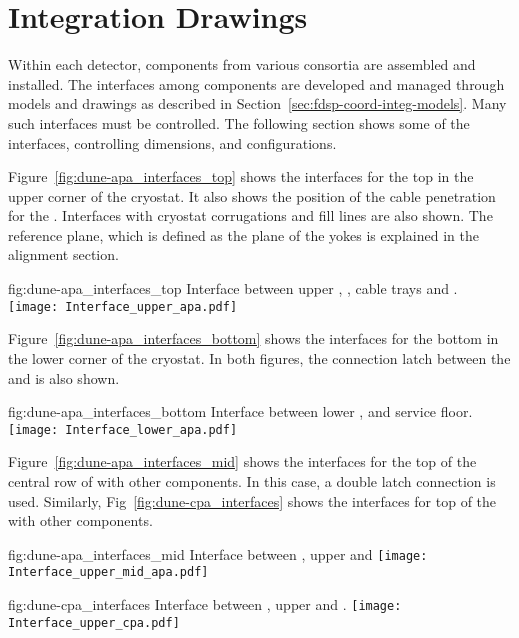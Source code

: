 \section{Integration Drawings}
\label{sec:fdsp-coord-integ-drawings}

Within each detector, components from various consortia are assembled
and installed. The interfaces among components are developed and
managed through models and drawings as described in
Section~\ref{sec:fdsp-coord-integ-models}. Many such interfaces must
be controlled. The following section shows some of the interfaces,
controlling dimensions, and configurations.


Figure~\ref{fig:dune-apa_interfaces_top} shows the interfaces for the
top  in the upper corner of the cryostat. It also shows the position
of the cable penetration for the . Interfaces with cryostat
corrugations and  fill lines are also shown. The reference plane,
which is defined as the plane of the  yokes is explained in the
alignment section.
\begin{dunefigure}{fig:dune-apa_interfaces_top}
  {Interface between upper , , cable
    trays and .}
  \texttt{[image: Interface\_upper\_apa.pdf]}
\end{dunefigure}


Figure~\ref{fig:dune-apa_interfaces_bottom} shows the interfaces for
the bottom  in the lower corner of the cryostat. In both figures,
the connection latch between the  and  is also
shown.
\begin{dunefigure}{fig:dune-apa_interfaces_bottom}
  {Interface between lower ,  and 
    service floor.}
  \texttt{[image: Interface\_lower\_apa.pdf]}
\end{dunefigure}


Figure~\ref{fig:dune-apa_interfaces_mid} shows the interfaces for the
top of the central row of  with other components. In this case, a
double latch connection is used. Similarly,
Fig~\ref{fig:dune-cpa_interfaces} shows the interfaces for top of the
 with other components.
\begin{dunefigure}{fig:dune-apa_interfaces_mid}
  {Interface between , upper  and }
  \texttt{[image: Interface\_upper\_mid\_apa.pdf]}
\end{dunefigure}
\begin{dunefigure}
    {fig:dune-cpa_interfaces}
  {Interface between , upper  and .}
  \texttt{[image: Interface\_upper\_cpa.pdf]}
\end{dunefigure}


